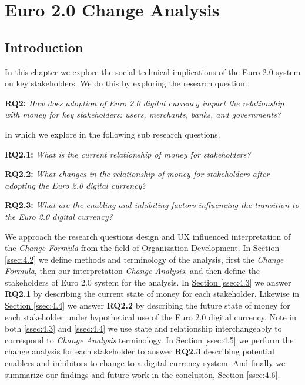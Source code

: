 \documentclass[a4paper,12pt]{article} %
\newcommand{\hypersectionref}[1]{\hyperref[#1]{Section \ref{#1}}}
\begin{document}
{\pagebreak

\section{Euro 2.0 Change Analysis} \label{sec:4}

\subsection{Introduction} \label{ssec:4.1}

In this chapter we explore the social technical implications of the Euro 2.0 system on key stakeholders. We do this by exploring the research question:

\begin{quoting}
	\textbf{RQ2:} \textit{How does adoption of Euro 2.0 digital currency impact the relationship with money for key stakeholders: users, merchants, banks, and governments?}
\end{quoting}

In which we explore in the following sub research questions.

\begin{quoting}
	\textbf{RQ2.1:} \textit{What is the current relationship of money for stakeholders?}
\end{quoting}
\begin{quoting}
	\textbf{RQ2.2:} \textit{What changes in the relationship of money for stakeholders after adopting the Euro 2.0 digital currency?}
\end{quoting}
\begin{quoting}
	\textbf{RQ2.3:} \textit{What are the enabling and inhibiting factors influencing the transition to the Euro 2.0 digital currency?}
\end{quoting}

We approach the research questions design and UX influenced interpretation of the \textit{Change Formula} from the field of Organization Development\cite{dannemiller1992}. In \hypersectionref{ssec:4.2} we define methods and terminology of the analysis, first the \textit{Change Formula}, then our interpretation \textit{Change Analysis}, and then define the stakeholders of Euro 2.0 system for the analysis. In \hypersectionref{ssec:4.3} we answer \textbf{RQ2.1} by describing the current state of money for each stakeholder. Likewise in \hypersectionref{ssec:4.4} we answer \textbf{RQ2.2} by describing the future state of money for each stakeholder under hypothetical use of the Euro 2.0 digital currency. Note in both \ref{ssec:4.3} and \ref{ssec:4.4} we use state and relationship interchangeably to correspond to \textit{Change Analysis} terminology. In \hypersectionref{ssec:4.5} we perform the change analysis for each stakeholder to answer \textbf{RQ2.3} describing potential enablers and inhibitors to change to a digital currency system. And finally we summarize our findings and future work in the conclusion, \hypersectionref{ssec:4.6}.

}
\end{document}
